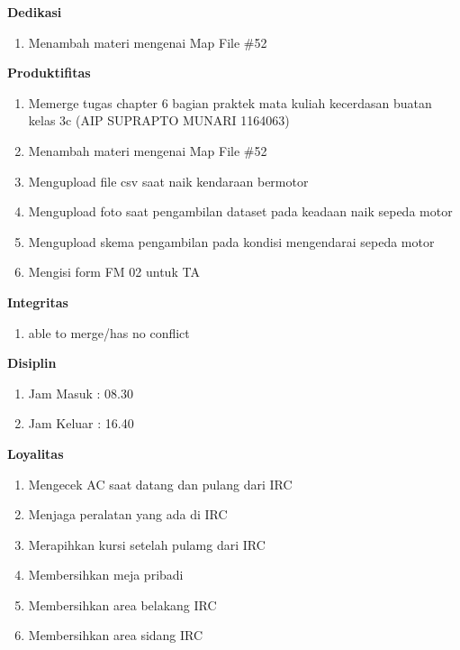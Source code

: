\begin{enumerate}
\textbf{Dedikasi}
\begin{enumerate}
\item Menambah materi mengenai Map File \#52
\end{enumerate}

\textbf{Produktifitas}
\begin{enumerate}
\item Memerge tugas chapter 6 bagian praktek mata kuliah kecerdasan buatan kelas 3c (AIP SUPRAPTO MUNARI 1164063)
\item Menambah materi mengenai Map File \#52
\item Mengupload file csv saat naik kendaraan bermotor
\item Mengupload foto saat pengambilan dataset pada keadaan naik sepeda motor
\item Mengupload skema pengambilan pada kondisi mengendarai sepeda motor
\item Mengisi form FM 02 untuk TA
\end{enumerate}

\textbf{Integritas}
\begin{enumerate}
\item able to merge/has no conflict
\end{enumerate}

\textbf{Disiplin}
\begin{enumerate}
\item Jam Masuk : 08.30
\item Jam Keluar : 16.40
\end{enumerate}

\textbf{Loyalitas}
\begin{enumerate}
\item Mengecek AC saat datang dan pulang dari IRC
\item Menjaga peralatan yang ada di IRC
\item Merapihkan kursi setelah pulamg dari IRC
\item Membersihkan meja pribadi
\item Membersihkan area belakang IRC
\item Membersihkan area sidang IRC
\end{enumerate}


\end{enumerate}
